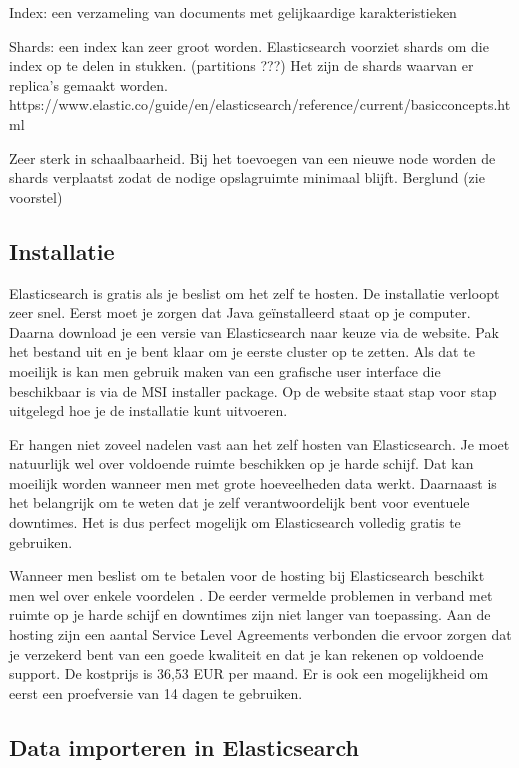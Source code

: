 {Index: een verzameling van documents met gelijkaardige karakteristieken 

Shards: een index kan zeer groot worden. Elasticsearch voorziet shards om die index op te delen in stukken. (partitions ???) Het zijn de shards waarvan er replica's gemaakt worden. https://www.elastic.co/guide/en/elasticsearch/reference/current/\textunderscore basic\textunderscore concepts.html

Zeer sterk in schaalbaarheid. Bij het toevoegen van een nieuwe node worden de shards verplaatst zodat de nodige opslagruimte minimaal blijft. Berglund (zie voorstel)  

\subsection{Installatie}
\label{Installatie}

Elasticsearch is gratis als je beslist om het zelf te hosten. De installatie verloopt zeer snel. Eerst moet je zorgen dat Java geïnstalleerd staat op je computer. Daarna download je een versie van Elasticsearch naar keuze via de website. Pak het bestand uit en je bent klaar om je eerste cluster op te zetten. Als dat te moeilijk is kan men gebruik maken van een grafische user interface die beschikbaar is via de MSI installer package. Op de website staat stap voor stap uitgelegd hoe je de installatie kunt uitvoeren. 


Er hangen niet zoveel nadelen vast aan het zelf hosten van Elasticsearch. Je moet natuurlijk wel over voldoende ruimte beschikken op je harde schijf. Dat kan moeilijk worden wanneer men met grote hoeveelheden data werkt. Daarnaast is het belangrijk om te weten dat je zelf verantwoordelijk bent voor eventuele downtimes. Het is dus perfect mogelijk om Elasticsearch volledig gratis te gebruiken. 

Wanneer men beslist om te betalen voor de hosting bij Elasticsearch beschikt men wel over enkele voordelen . De eerder vermelde problemen in verband met ruimte op je harde schijf en downtimes zijn niet langer van toepassing.  Aan de hosting zijn een aantal Service Level Agreements verbonden die ervoor zorgen dat je verzekerd bent van een goede kwaliteit en dat je kan rekenen op voldoende support. De kostprijs is 36,53 EUR per maand. Er is ook een mogelijkheid om eerst een proefversie van 14 dagen te gebruiken.

\subsection{Data importeren in Elasticsearch}

}
